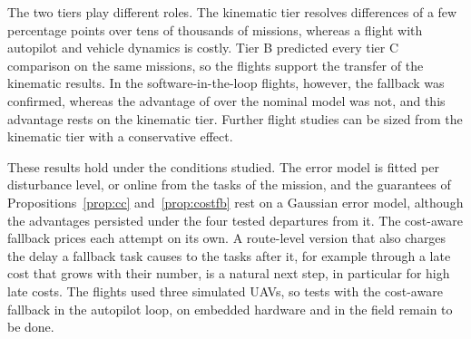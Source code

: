 The two tiers play different roles. The kinematic tier resolves differences of a few percentage points over tens of
thousands of missions, whereas a flight with autopilot and vehicle dynamics is costly. Tier B predicted every tier C
comparison on the same missions, so the flights support the transfer of the kinematic results. In the software-in-the-loop
flights, however, the fallback was confirmed, whereas the advantage of \mname{} over the nominal model was not, and this
advantage rests on the kinematic tier. Further flight studies can be sized from the kinematic tier with a conservative
effect.

These results hold under the conditions studied. The error model is fitted per disturbance level, or online from the
tasks of the mission, and the guarantees of Propositions~\ref{prop:cc} and~\ref{prop:costfb} rest on a Gaussian error
model, although the advantages persisted under the four tested departures from it. The cost-aware fallback prices each
attempt on its own. A route-level version that also charges the delay a fallback task causes to the tasks after it, for
example through a late cost that grows with their number, is a natural next step, in particular for high late costs.
The flights used three simulated UAVs, so tests with the cost-aware fallback in the autopilot loop, on embedded hardware
and in the field remain to be done.

